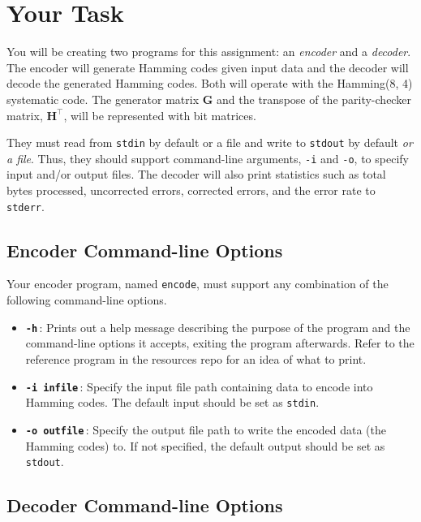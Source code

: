 \documentclass[11pt]{article}
\begin{document}
\section{Your Task}

You will be creating two programs for this assignment: an \emph{encoder}
and a \emph{decoder}. The encoder will generate Hamming codes given
input data and the decoder will decode the generated Hamming codes. Both
will operate with the Hamming(8, 4) systematic code. The generator
matrix $\boldsymbol{G}$ and the transpose of the parity-checker matrix,
$\boldsymbol{H}^\intercal$, will be represented with bit matrices.

They must read from \texttt{stdin} by default or a file and write to
\texttt{stdout} by default \emph{or a file}. Thus, they should support
command-line arguments, \texttt{-i} and \texttt{-o}, to specify input
and/or output files.  The decoder will also print statistics such as
total bytes processed, uncorrected errors, corrected errors, and the
error rate to \texttt{stderr}.

\subsection{Encoder Command-line Options}

Your encoder program, named \texttt{encode}, must support any
combination of the following command-line options.

\begin{itemize}
  \item \textbf{\texttt{-h}}\,: Prints out a help message describing the purpose
    of the program and the command-line options it accepts, exiting the
    program afterwards. Refer to the reference program in the resources
    repo for an idea of what to print.
  \item \textbf{\texttt{-i infile}}\,: Specify the input file path
    containing data to encode into Hamming codes. The default input
    should be set as \texttt{stdin}.
  \item \textbf{\texttt{-o outfile}}\,: Specify the output file path to
    write the encoded data (the Hamming codes) to. If not specified, the
    default output should be set as \texttt{stdout}.
\end{itemize}

\subsection{Decoder Command-line Options}
\end{document}
